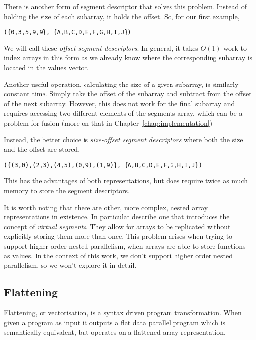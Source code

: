 There is another form of segment descriptor that solves this problem. Instead of holding the size of each subarray, it holds the offset. So, for our first example,
%
\begin{lstlisting}
({0,3,5,9,9}, {A,B,C,D,E,F,G,H,I,J})
\end{lstlisting}
%
We will call these \emph{offset segment descriptors}. In general, it takes $O(1)$ work to index arrays in this form as we already know where the corresponding subarray is located in the values vector.

Another useful operation, calculating the size of a given subarray, is similarly constant time. Simply take the offset of the subarray and subtract from the offset of the next subarray. However, this does not work for the final subarray and requires accessing two different elements of the segments array, which can be a problem for fusion (more on that in Chapter~\ref{chap:implementation}).

Instead, the better choice is \emph{size-offset segment descriptors} where both the size and the offset are stored.
%
\begin{lstlisting}
({(3,0),(2,3),(4,5),(0,9),(1,9)}, {A,B,C,D,E,F,G,H,I,J})
\end{lstlisting}
%
This has the advantages of both representations, but does require twice as much memory to store the segment descriptors.


It is worth noting that there are other, more complex, nested array representations in existence. In particular \citet{Lippmeier:replicate} describe one that introduces the concept of \emph{virtual segments}. They allow for arrays to be replicated without explicitly storing them more than once. This problem arises when trying to support higher-order nested parallelism, when arrays are able to store functions as values. In the context of this work, we don't support higher order nested parallelism, so we won't explore it in detail.

\subsection{Flattening}

Flattening, or vectorisation, is a syntax driven program transformation. When given a program as input it outputs a flat data parallel program which is semantically equivalent, but operates on a flattened array representation.

